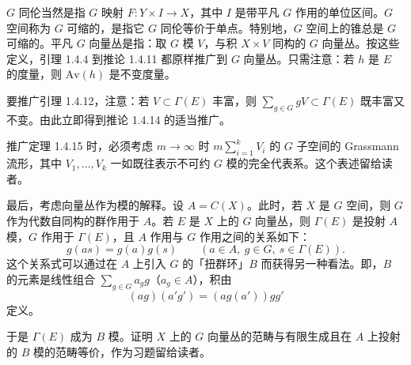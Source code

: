 $G$ 同伦当然是指 $G$ 映射 $F\colon Y\times I\to X$，其中 $I$ 是带平凡 $G$ 作用的单位区间。$G$ 空间称为 $G$ 可缩的，是指它 $G$ 同伦等价于单点。特别地，$G$ 空间上的锥总是 $G$ 可缩的。平凡 $G$ 向量丛是指：取 $G$ 模 $V$，与积 $X\times V$ 同构的 $G$ 向量丛。按这些定义，引理 1.4.4 到推论 1.4.11 都原样推广到 $G$ 向量丛。只需注意：若 $h$ 是 $E$ 的度量，则 $\mathrm{Av}(h)$ 是不变度量。

要推广引理 1.4.12，注意：若 $V\subset\Gamma(E)$ 丰富，则 $\sum_{g\in G}gV\subset\Gamma(E)$ 既丰富又不变。由此立即得到推论 1.4.14 的适当推广。

推广定理 1.4.15 时，必须考虑 $m\to\infty$ 时 $m\sum_{i=1}^{k}V_i$ 的 $G$ 子空间的 Grassmann 流形，其中 $V_1,\dots,V_k$ 一如既往表示不可约 $G$ 模的完全代表系。这个表述留给读者。

最后，考虑向量丛作为模的解释。设 $A=C(X)$。此时，若 $X$ 是 $G$ 空间，则 $G$ 作为代数自同构的群作用于 $A$。若 $E$ 是 $X$ 上的 $G$ 向量丛，则 $\Gamma(E)$ 是投射 $A$ 模，$G$ 作用于 $\Gamma(E)$，且 $A$ 作用与 $G$ 作用之间的关系如下：
\[
g(as)=g(a)g(s)\qquad(a\in A,\ g\in G,\ s\in\Gamma(E)).
\]
这个关系式可以通过在 $A$ 上引入 $G$ 的「扭群环」$B$ 而获得另一种看法。即，$B$ 的元素是线性组合 $\sum_{g\in G}a_g g$（$a_g\in A$），积由
\[
(ag)(a'g')=(ag(a'))gg'
\]
定义。

于是 $\Gamma(E)$ 成为 $B$ 模。证明 $X$ 上的 $G$ 向量丛的范畴与有限生成且在 $A$ 上投射的 $B$ 模的范畴等价，作为习题留给读者。


